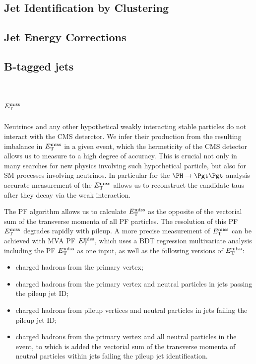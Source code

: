 \subsection{Jet Identification by Clustering}
\label{sec:jetID}

\subsection{Jet Energy Corrections}
\label{sec:JEC}

\subsection{B-tagged jets}
\label{sec:btag}

\section{$E_{\mathrm{T}}^{\text{miss}}$}
\label{sec:met}

Neutrinos and any other hypothetical weakly interacting stable particles do not
interact with the CMS deterctor. We infer their production from the resulting
imbalance in $E_{\mathrm{T}}^{\text{miss}}$ in a given event, which the hermeticity of the CMS detector
allows us to measure to a high degree of accuracy. This is crucial not only in
many searches for new physics involving such hypothetical particle, but also for
\ac{SM} processes involving neutrinos. In particular for the $\PH \to \Pgt\Pgt$
analysis accurate measurement of the $E_{\mathrm{T}}^{\text{miss}}$ allows us to reconstruct the
candidate taus after they decay via the weak interaction.

The \ac{PF} algorithm allows us to calculate $E_{\mathrm{T}}^{\text{miss}}$ as the opposite of the vectorial sum
of the transverse momenta of all PF particles. The resolution of this PF
$E_{\mathrm{T}}^{\text{miss}}$ degrades rapidly with pileup. A more precise
measurement of $E_{\mathrm{T}}^{\text{miss}}$ can be achieved with MVA PF
$E_{\mathrm{T}}^{\text{miss}}$, which uses a BDT regression multivariate analysis
including the PF $E_{\mathrm{T}}^{\text{miss}}$ as one input, as well as the following
versions of $E_{\mathrm{T}}^{\text{miss}}$:
\begin{itemize}
\item charged hadrons from the primary vertex;
\item charged hadrons from the primary vertex and neutral particles in jets
passing the
pileup jet ID;
\item charged hadrons from pileup vertices and neutral particles in jets failing
the pileup jet ID;
\item charged hadrons from the primary vertex and all neutral particles in the
event, to which is added the vectorial sum of the transverse momenta of neutral
particles within jets failing the pileup jet identification.
\end{itemize}


